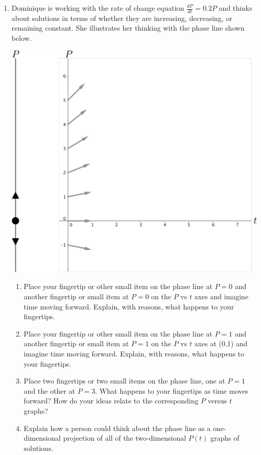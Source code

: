 \clearpage


\begin{enumerate}[resume]
\item Dominique is working with the rate of change equation $\frac{dP}{dt}=0.2P$  and thinks about solutions in terms of whether they are increasing, decreasing, or remaining constant. She illustrates her thinking with the phase line shown below. 
\begin{center}
\includegraphics[width=6in]{04/04PhaseLineAndSomeVectors.pdf} \\
\end{center}
\clearpage
\begin{enumerate}
\item	Place your fingertip or other small item on the phase line at $P = 0$ and another fingertip or small item at $P = 0$ on the $P$ vs $t$ axes and imagine time moving forward. Explain, with reasons, what happens to your fingertips. \label{04problem5parta} \vfill

\item	Place your fingertip or other small item on the phase line at $P = 1$ and another fingertip or small item at $P = 1$ on the $P$ vs $t$ axes at (0,1) and imagine time moving forward. Explain, with reasons, what happens to your fingertips. \label{04problem5partb}   \vfill

\item	Place two fingertips or two small items on the phase line, one at $P = 1$ and the other at $P = 3$. What happens to your fingertips as time moves forward? How do your ideas relate to the corresponding $P$ versus $t$ graphs? \label{04problem5partc}  \vfill

\item	Explain how a person could think about the phase line as a one-dimensional projection of all of the two-dimensional $P(t)$ graphs of solutions. \label{04problem5partd} \vfill

\end{enumerate}
\end{enumerate}
\clearpage

